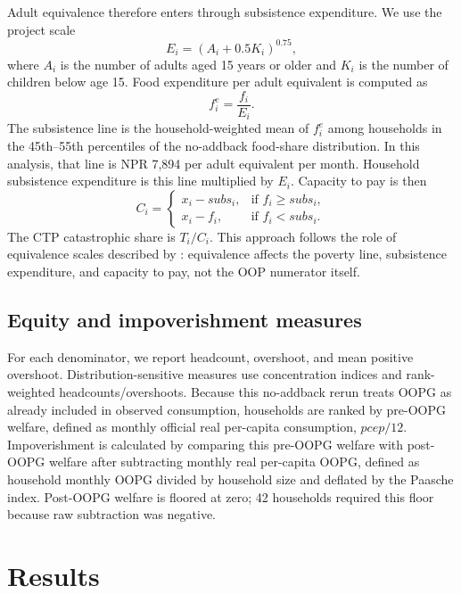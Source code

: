 \documentclass[11pt]{article}
\begin{document}
Adult equivalence therefore enters through subsistence expenditure. We use the project scale
\begin{equation}
E_i = (A_i + 0.5K_i)^{0.75},
\end{equation}
where $A_i$ is the number of adults aged 15 years or older and $K_i$ is the number of children below age 15. Food expenditure per adult equivalent is computed as
\begin{equation}
f_i^e = \frac{f_i}{E_i}.
\end{equation}
The subsistence line is the household-weighted mean of $f_i^e$ among households in the 45th--55th percentiles of the no-addback food-share distribution. In this analysis, that line is NPR 7,894 per adult equivalent per month. Household subsistence expenditure is this line multiplied by $E_i$. Capacity to pay is then
\begin{equation}
C_i =
\begin{cases}
x_i - subs_i, & \text{if } f_i \ge subs_i, \\
x_i - f_i, & \text{if } f_i < subs_i.
\end{cases}
\end{equation}
The CTP catastrophic share is $T_i/C_i$. This approach follows the role of equivalence scales described by \citet{koch2018}: equivalence affects the poverty line, subsistence expenditure, and capacity to pay, not the OOP numerator itself.

\subsection{Equity and impoverishment measures}

For each denominator, we report headcount, overshoot, and mean positive overshoot. Distribution-sensitive measures use concentration indices and rank-weighted headcounts/overshoots. Because this no-addback rerun treats OOPG as already included in observed consumption, households are ranked by pre-OOPG welfare, defined as monthly official real per-capita consumption, $pcep/12$. Impoverishment is calculated by comparing this pre-OOPG welfare with post-OOPG welfare after subtracting monthly real per-capita OOPG, defined as household monthly OOPG divided by household size and deflated by the Paasche index. Post-OOPG welfare is floored at zero; 42 households required this floor because raw subtraction was negative.

\section{Results}
\end{document}
